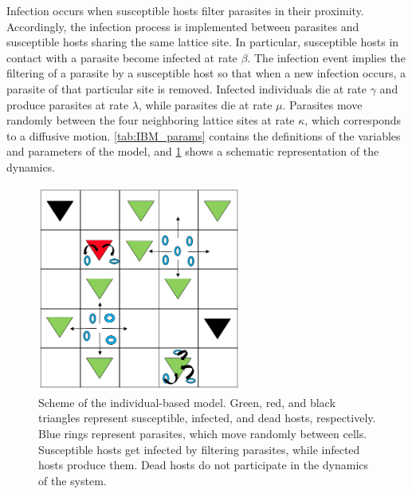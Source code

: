 Infection occurs when susceptible hosts filter parasites in their proximity.
Accordingly, the infection process is implemented between parasites
and susceptible hosts sharing the same lattice site. In particular, susceptible
hosts in contact with a parasite become infected at rate $\beta$. The infection
event implies the filtering of a parasite by a susceptible host so that when
a new infection occurs, a parasite of that particular site is removed. Infected
individuals die at rate $\gamma$ and produce parasites at rate $\lambda$, while
parasites die at rate $\mu$. Parasites move randomly between the four
neighboring lattice sites at rate $\kappa$, which corresponds to a diffusive
motion. \cref{tab:IBM_params} contains the definitions of the variables and
parameters of the model, and \cref{fig:IBM} shows a schematic representation of
the dynamics.

\begin{figure}[H]
    \centering
    \includegraphics[width=0.6\textwidth]{Figures/IBM.png}
    \caption[Scheme of the individual-based SIRP model]{Scheme of the
        individual-based model. Green, red, and black
        triangles represent susceptible, infected, and dead hosts,
        respectively. Blue rings represent parasites, which move randomly
        between cells. Susceptible hosts get infected by filtering parasites,
        while infected hosts produce them. Dead hosts do not participate in the
        dynamics of the system.}
    \label{fig:IBM}
\end{figure}

